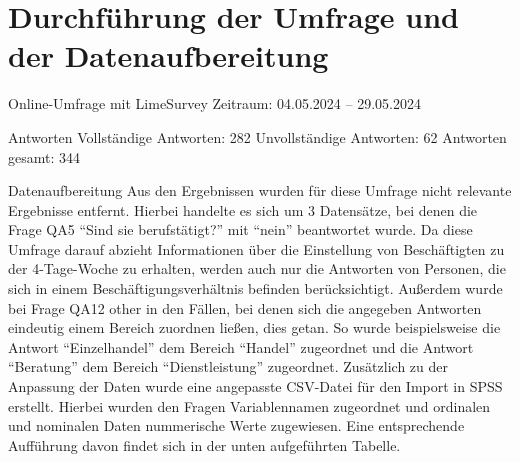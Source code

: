 \chapter{Durchführung der Umfrage und der Datenaufbereitung}


Online-Umfrage mit LimeSurvey 
Zeitraum: 04.05.2024 – 29.05.2024 
 
Antworten  
Vollständige Antworten: 282 
Unvollständige Antworten: 62 
Antworten gesamt: 344 

Datenaufbereitung 
Aus den Ergebnissen wurden für diese Umfrage nicht relevante Ergebnisse entfernt. 
Hierbei handelte es sich um 3 Datensätze, bei denen die Frage QA5 “Sind sie berufstätigt?” 
mit “nein” beantwortet wurde. Da diese Umfrage darauf abzieht Informationen über die 
Einstellung von Beschäftigten zu der 4-Tage-Woche zu erhalten, werden auch nur die 
Antworten von Personen, die sich in einem Beschäftigungsverhältnis befinden berücksichtigt. 
Außerdem wurde bei Frage QA12 other in den Fällen, bei denen sich die angegeben Antworten 
eindeutig einem Bereich zuordnen ließen, dies getan. So wurde beispielsweise die Antwort 
“Einzelhandel” dem Bereich “Handel” zugeordnet und die Antwort “Beratung” dem Bereich 
“Dienstleistung” zugeordnet.  
Zusätzlich zu der Anpassung der Daten wurde eine angepasste CSV-Datei für den Import 
in SPSS erstellt. Hierbei wurden den Fragen Variablennamen zugeordnet und ordinalen 
und nominalen Daten nummerische Werte zugewiesen. Eine entsprechende Aufführung davon 
findet sich in der unten aufgeführten Tabelle. 